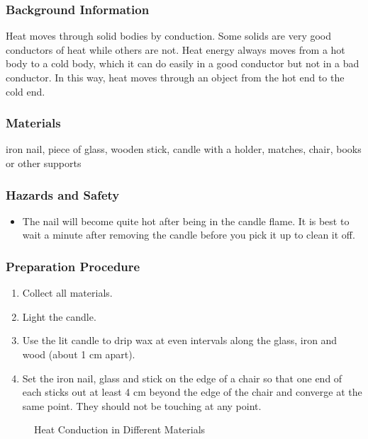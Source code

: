 \subsubsection*{Background Information}
Heat moves through solid bodies by conduction. Some solids are very good conductors of heat while others are not. Heat energy always moves from a hot body to a cold body, which it can do easily in a good conductor but not in a bad conductor. In this way, heat moves through an object from the hot end to the cold end.  

\subsubsection*{Materials}
iron nail, piece of glass, wooden stick, candle with a holder, matches, chair, books or other supports

\subsubsection*{Hazards and Safety}
\begin{itemize}
\item{The nail will become quite hot after being in the candle flame. It is best to wait a minute after removing the candle before you pick it up to clean it off.} 
\end{itemize}

\subsubsection*{Preparation Procedure}
\begin{enumerate}
\item{Collect all materials.} 
\item{Light the candle.} 
\item{Use the lit candle to drip wax at even intervals along the glass, iron and wood (about 1 cm apart).} 
\item{Set the iron nail, glass and stick on the edge of a chair so that one end of each sticks out at least 4 cm beyond the edge of the chair and converge at the same point. They should not be touching at any point.} 
\end{enumerate}

\begin{figure}
\begin{center}
\def\svgwidth{100pt}

\caption{Heat Conduction in Different Materials}
\label{fig:heat-conduction}
\end{center}
\end{figure}


